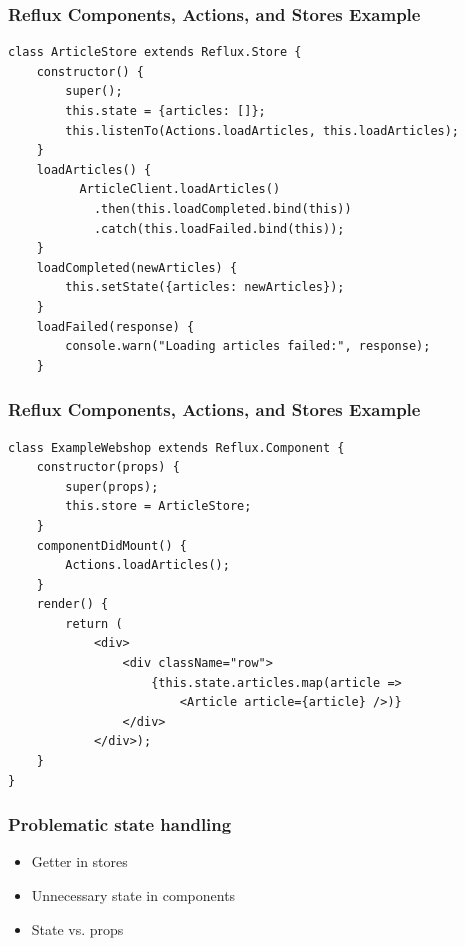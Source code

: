 \documentclass{beamer}
\begin{document}
\begin{frame}[fragile]\frametitle{Reflux Components, Actions, and Stores \textendash{} Example}
\begin{lstlisting}[style=htmlcssjs]
class ArticleStore extends Reflux.Store {
    constructor() {
        super();
        this.state = {articles: []};
        this.listenTo(Actions.loadArticles, this.loadArticles);
    }
    loadArticles() {
          ArticleClient.loadArticles()
            .then(this.loadCompleted.bind(this))
            .catch(this.loadFailed.bind(this));
    }
    loadCompleted(newArticles) {
        this.setState({articles: newArticles});
    }
    loadFailed(response) {
        console.warn("Loading articles failed:", response);
    }
\end{lstlisting}
\end{frame}

\begin{frame}[fragile]\frametitle{Reflux Components, Actions, and Stores \textendash{} Example}
\begin{lstlisting}[style=htmlcssjs]
class ExampleWebshop extends Reflux.Component {
    constructor(props) {
        super(props);
        this.store = ArticleStore;
    }
    componentDidMount() {
        Actions.loadArticles();
    }
    render() {
        return (
            <div>
                <div className="row">
                    {this.state.articles.map(article =>
                        <Article article={article} />)}
                </div>
            </div>);
    }
}
\end{lstlisting}
\end{frame}

\begin{frame}\frametitle{Problematic state handling}
\begin{itemize}
\item Getter in stores
\item Unnecessary state in components
\item State vs. props
\end{itemize}
\end{frame}
\end{document}
